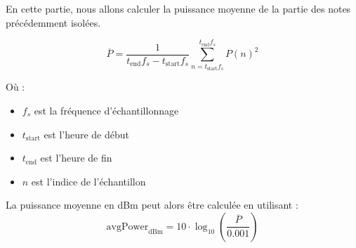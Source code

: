 En cette partie, nous allons calculer la puissance moyenne de la partie des notes précédemment isolées.

\begin{equation}
    \overline{P} = \frac{1}{t_{\text{end}} f_s - t_{\text{start}} f_s} \sum_{n=t_{\text{start}} f_s}^{t_{\text{end}} f_s} P(n)^2
\end{equation}


Où :
\begin{itemize}
  \item \( f_s \) est la fréquence d'échantillonnage
  \item \( t_{\text{start}} \) est l'heure de début
  \item \( t_{\text{end}} \) est l'heure de fin
  \item \( n \) est l'indice de l'échantillon
\end{itemize}

La puissance moyenne en dBm peut alors être calculée en utilisant :
\begin{equation}
    \text{avgPower}_{\text{dBm}} = 10 \cdot \log_{10}\left(\frac{\overline{P}}{0.001}\right)
\end{equation}